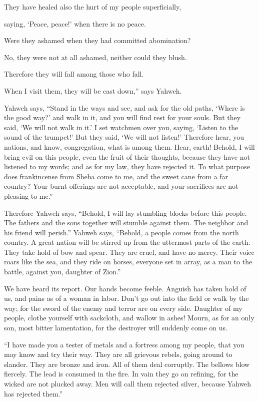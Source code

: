 {\par }{\Q {}They have healed also the hurt of my people superficially,
\par }{\QB saying, ‘Peace, peace!’ when there is no peace.
\par }{\Q {}Were they ashamed when they had committed abomination?
\par }{\QB No, they were not at all ashamed, neither could they blush.
\par }{\Q Therefore they will fall among those who fall.
\par }{\QB When I visit them, they will be cast down,” says Yahweh.
\par }{\PP {}Yahweh says, “Stand in the ways and see, and ask for the old paths, ‘Where is the good way?’ and walk in it, and you will find rest for your souls. But they said, ‘We will not walk in it.’
I set watchmen over you, saying, ‘Listen to the sound of the trumpet!’ But they said, ‘We will not listen!’
Therefore hear, you nations, and know, congregation, what is among them.
Hear, earth! Behold, I will bring evil on this people, even the fruit of their thoughts, because they have not listened to my words; and as for my law, they have rejected it.
To what purpose does frankincense from Sheba come to me, and the sweet cane from a far country? Your burnt offerings are not acceptable, and your sacrifices are not pleasing to me.”
\par }{\PP {}Therefore Yahweh says, “Behold, I will lay stumbling blocks before this people. The fathers and the sons together will stumble against them. The neighbor and his friend will perish.”
Yahweh says, “Behold, a people comes from the north country. A great nation will be stirred up from the uttermost parts of the earth.
They take hold of bow and spear. They are cruel, and have no mercy. Their voice roars like the sea, and they ride on horses, everyone set in array, as a man to the battle, against you, daughter of Zion.”
\par }{\PP {}We have heard its report. Our hands become feeble. Anguish has taken hold of us, and pains as of a woman in labor.
Don’t go out into the field or walk by the way; for the sword of the enemy and terror are on every side.
Daughter of my people, clothe yourself with sackcloth, and wallow in ashes! Mourn, as for an only son, most bitter lamentation, for the destroyer will suddenly come on us.
\par }{\PP {}“I have made you a tester of metals and a fortress among my people, that you may know and try their way.
They are all grievous rebels, going around to slander. They are bronze and iron. All of them deal corruptly.
The bellows blow fiercely. The lead is consumed in the fire. In vain they go on refining, for the wicked are not plucked away.
Men will call them rejected silver, because Yahweh has rejected them.”

}
